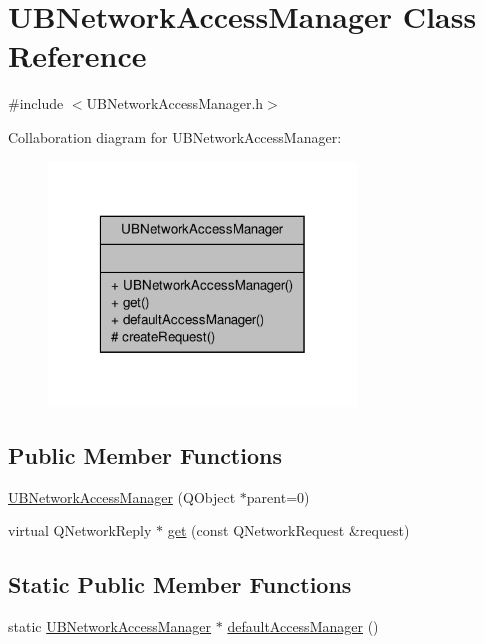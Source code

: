 \hypertarget{class_u_b_network_access_manager}{\section{U\-B\-Network\-Access\-Manager Class Reference}
\label{db/dad/class_u_b_network_access_manager}
}


{\ttfamily \#include $<$U\-B\-Network\-Access\-Manager.\-h$>$}



Collaboration diagram for U\-B\-Network\-Access\-Manager\-:
\nopagebreak
\begin{figure}[H]
\begin{center}
\leavevmode
\includegraphics[width=232pt]{d2/d49/class_u_b_network_access_manager__coll__graph}
\end{center}
\end{figure}
\subsection*{Public Member Functions}
\begin{DoxyCompactItemize}
\item 
\hyperlink{class_u_b_network_access_manager_a5cf3eea86eba0bbf3a5af8056c84dfc8}{U\-B\-Network\-Access\-Manager} (Q\-Object $\ast$parent=0)
\item 
virtual Q\-Network\-Reply $\ast$ \hyperlink{class_u_b_network_access_manager_a4939a9c1018c4cc416db0f1b1dcbe581}{get} (const Q\-Network\-Request \&request)
\end{DoxyCompactItemize}
\subsection*{Static Public Member Functions}
\begin{DoxyCompactItemize}
\item 
static \hyperlink{class_u_b_network_access_manager}{U\-B\-Network\-Access\-Manager} $\ast$ \hyperlink{class_u_b_network_access_manager_aff17aa07b0b023bbe5f30bd39db43ccb}{default\-Access\-Manager} ()
\end{DoxyCompactItemize}
